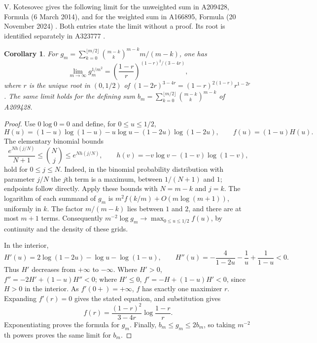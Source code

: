 \documentclass[11pt]{article}
\newtheorem{corollary}[theorem]{Corollary}
\begin{document}
V. Kotesovec gives the following limit for the unweighted sum in A209428,
Formula (6 March 2014), and for the weighted sum in A166895, Formula
(20 November 2024) \cite{limit209,logs}. Both entries state the limit
without a proof. Its root is identified separately in A323777 \cite{root}.
\begin{corollary}\label{cor:limit}
For $g_m=\sum_{k=0}^{\lfloor m/2\rfloor}
\binom{m-k}{k}^{m-k}m/(m-k)$, one has
\[
 \lim_{m\to\infty}g_m^{1/m^2}
 =\left(\frac{1-r}{r}\right)^{(1-r)^2/(3-4r)},
\]
where $r$ is the unique root in $(0,1/2)$ of
$(1-2r)^{3-4r}=(1-r)^{2(1-r)}r^{1-2r}$.
The same limit holds for the defining sum
$b_m=\sum_{k=0}^{\lfloor m/2\rfloor}\binom{m-k}{k}^{m-k}$ of A209428.
\end{corollary}
\begin{proof}
Use $0\log0=0$ and define, for $0\le u\le1/2$,
\[
 H(u)=(1-u)\log(1-u)-u\log u-(1-2u)\log(1-2u),
 \qquad f(u)=(1-u)H(u).
\]
The elementary binomial bounds
\[
 \frac{e^{Nh(j/N)}}{N+1}\le\binom Nj\le e^{Nh(j/N)},
 \qquad h(v)=-v\log v-(1-v)\log(1-v),
\]
hold for $0\le j\le N$. Indeed, in the binomial probability
distribution with parameter $j/N$ the $j$th term is a maximum,
between $1/(N+1)$ and $1$; endpoints follow directly.
Apply these bounds with $N=m-k$ and $j=k$.
The logarithm of each summand of $g_m$ is
$m^2f(k/m)+O(m\log(m+1))$, uniformly in $k$.
The factor $m/(m-k)$ lies between $1$ and $2$, and there are at most
$m+1$ terms. Consequently
$m^{-2}\log g_m\to\max_{0\le u\le1/2}f(u)$,
by continuity and the density of these grids.

In the interior,
\[
 H'(u)=2\log(1-2u)-\log u-\log(1-u),\qquad
 H''(u)=-\frac{4}{1-2u}-\frac1u+\frac1{1-u}<0.
\]
Thus $H'$ decreases from $+\infty$ to $-\infty$.
Where $H'>0$, $f''=-2H'+(1-u)H''<0$; where $H'\le0$,
$f'=-H+(1-u)H'<0$, since $H>0$ in the interior.
As $f'(0+)=+\infty$, $f$ has exactly one maximizer $r$.
Expanding $f'(r)=0$ gives the stated equation, and substitution gives
\[
 f(r)=\frac{(1-r)^2}{3-4r}\log\frac{1-r}{r}.
\]
Exponentiating proves the formula for $g_m$. Finally,
$b_m\le g_m\le2b_m$, so taking $m^{-2}$th powers proves the same limit
for $b_m$.
\end{proof}
\end{document}
